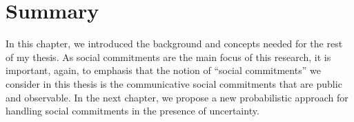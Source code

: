 \section{Summary}\label{sec:summary-chap2}
In this chapter, we introduced the background and concepts needed for the rest of my thesis. As social commitments are the main focus of this research, it is important, again, to emphasis that the notion of ``social commitments'' we consider in this thesis is the communicative social commitments that are public and observable. In the next chapter, we propose a new probabilistic approach for handling social commitments in the presence of uncertainty.
